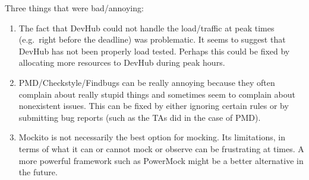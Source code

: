 \documentclass[]{article}
\providecommand{\tightlist}{%
  \setlength{\itemsep}{0pt}\setlength{\parskip}{0pt}}
\begin{document}
Three things that were bad/annoying:

\begin{enumerate}
\def\labelenumi{\arabic{enumi}.}
\tightlist
\item
  The fact that DevHub could not handle the load/traffic at peak times
  (e.g.~right before the deadline) was problematic. It seems to suggest
  that DevHub has not been properly load tested. Perhaps this could be
  fixed by allocating more resources to DevHub during peak hours.
\item
  PMD/Checkstyle/Findbugs can be really annoying because they often
  complain about really stupid things and sometimes seem to complain
  about nonexistent issues. This can be fixed by either ignoring certain
  rules or by submitting bug reports (such as the TAs did in the case of
  PMD).
\item
  Mockito is not necessarily the best option for mocking. Its
  limitations, in terms of what it can or cannot mock or observe can be
  frustrating at times. A more powerful framework such as PowerMock
  might be a better alternative in the future.
\end{enumerate}
\end{document}
